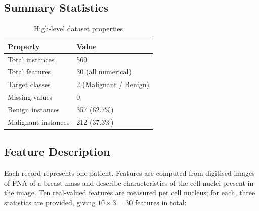 \documentclass[12pt,a4paper]{article}
\begin{document}
\subsection{Summary Statistics}

\begin{table}[H]
  \centering
  \caption{High-level dataset properties}
  \begin{tabular}{ll}
    \toprule
    \textbf{Property} & \textbf{Value} \\
    \midrule
    Total instances          & 569 \\
    Total features           & 30 (all numerical) \\
    Target classes           & 2 (Malignant / Benign) \\
    Missing values           & 0 \\
    Benign instances         & 357 (62.7\%) \\
    Malignant instances      & 212 (37.3\%) \\
    \bottomrule
  \end{tabular}
\end{table}

\subsection{Feature Description}
Each record represents one patient. Features are computed from digitised images of FNA
of a breast mass and describe characteristics of the cell nuclei present in the image.
Ten real-valued features are measured per cell nucleus; for each, three statistics are
provided, giving $10 \times 3 = 30$ features in total:
\end{document}
